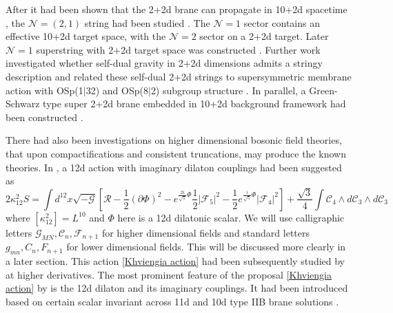 After it had been shown that the 2+2d brane can propagate in 10+2d spacetime \cite{Blencowe:1988sk}, the $\mathcal N=(2,1)$ string had been studied \cite{Kutasov:1996fp, Kutasov:1996zm, Martinec:1996wn}. The $\mathcal N=1$ sector contains an effective 10+2d target space, with the $\mathcal N=2$ sector on a 2+2d target. 
Later $\mathcal N=1$ superstring with 2+2d target space was constructed \cite{Khviengia:1995pm,Lu:1995pn}.
Further work investigated whether self-dual gravity in 2+2d dimensions admits a stringy description \cite{Sezgin:1995fj} and related these self-dual 2+2d strings to supersymmetric membrane action with OSp(1$|$32) and OSp(8$|$2) subgroup structure \cite{Ketov:1996gr}.
In parallel, a Green-Schwarz type super 2+2d brane embedded in 10+2d background framework had been constructed \cite{Hewson:1996yh,Hewson:1997wv,Hewson:1998sw}.

There had also been investigations on higher dimensional bosonic field theories, that upon compactifications and consistent truncations, may produce the known theories.
In \cite{Khviengia:1997rh}, a 12d action with imaginary dilaton couplings had been suggested as
\begin{equation}
2\kappa_{12}^2S
=\int d^{12}x\sqrt{-\mathcal G}
\left[
\mathcal R-\frac{1}{2}(\partial\Phi)^2-e^{\frac{2i}{\sqrt{5}} \Phi}
\frac{1}{2}|\mathcal{F}_5|^2
-\frac{1}{2}e^{\frac{i}{\sqrt{5}}\Phi }|\mathcal{F}_4|^2
\right]
+\frac{\sqrt{3}}{4}\int \mathcal{C}_4\wedge d\mathcal{C}_3 \wedge d\mathcal{C}_3
\label{Khviengia action}
\end{equation}
where $[\kappa_{12}^2]=L^{10}$ and $\Phi$ here is a 12d dilatonic scalar.
We will use calligraphic letters $\mathcal{G}_{MN},\mathcal C_n,\mathcal{F}_{n+1}$ for higher dimensional fields and standard letters $g_{mn},C_n,F_{n+1}$ for lower dimensional fields. 
This will be discussed more clearly in a later section.
This action \eqref{Khviengia action} had been subsequently studied by \cite{Bakhtiarizadeh:2018upg} at higher derivatives. 
The most prominent feature of the proposal \eqref{Khviengia action} by \cite{Khviengia:1997rh} is the 12d dilaton and its imaginary couplings.
It had been introduced based on certain scalar invariant \cite{Lu:1995cs} across 11d and 10d type IIB brane solutions \cite{Khviengia:1997rh}.

